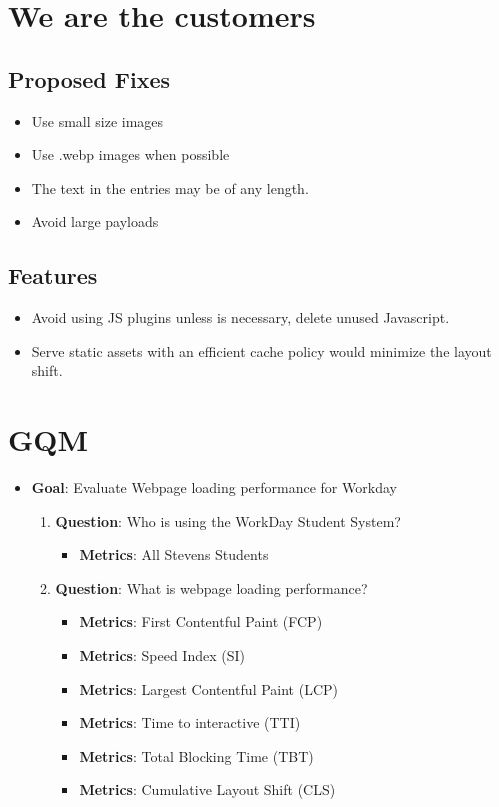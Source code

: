 \pagebreak

\section{We are the customers}
\subsection{Proposed Fixes}
\begin{itemize}
    \item Use small size images
    \item Use .webp images when possible
    \item The text in the entries may be of any length.
    \item Avoid large payloads
  \end{itemize}
\subsection{Features}
\begin{itemize}
    \item Avoid using JS plugins unless is necessary, delete unused Javascript.
    \item Serve static assets with an efficient cache policy would minimize the layout shift.
\end{itemize}

\pagebreak

\section{GQM}
\begin{itemize}
    \item \textbf{Goal}: Evaluate Webpage loading performance for Workday
    \begin{enumerate}
        \item \textbf{Question}: Who is using the WorkDay Student System?
        \begin{itemize}
            \item \textbf{Metrics}: All Stevens Students
        \end{itemize}        
        \item \textbf{Question}: What is webpage loading performance?
        \begin{itemize}
            \item \textbf{Metrics}: First Contentful Paint (FCP)
            \item \textbf{Metrics}: Speed Index (SI)
            \item \textbf{Metrics}: Largest Contentful Paint (LCP) 
            \item \textbf{Metrics}: Time to interactive (TTI)
            \item \textbf{Metrics}: Total Blocking Time (TBT) 
            \item \textbf{Metrics}: Cumulative Layout Shift (CLS)
        \end{itemize}
    \end{enumerate}        
\end{itemize}